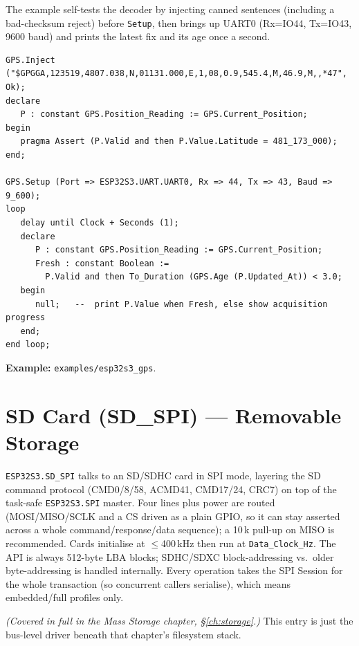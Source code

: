 The example self-tests the decoder by injecting canned sentences (including a
bad-checksum reject) before \texttt{Setup}, then brings up UART0 (Rx=IO44, Tx=IO43,
9600 baud) and prints the latest fix and its age once a second.

\begin{lstlisting}
GPS.Inject ("$GPGGA,123519,4807.038,N,01131.000,E,1,08,0.9,545.4,M,46.9,M,,*47", Ok);
declare
   P : constant GPS.Position_Reading := GPS.Current_Position;
begin
   pragma Assert (P.Valid and then P.Value.Latitude = 481_173_000);
end;

GPS.Setup (Port => ESP32S3.UART.UART0, Rx => 44, Tx => 43, Baud => 9_600);
loop
   delay until Clock + Seconds (1);
   declare
      P : constant GPS.Position_Reading := GPS.Current_Position;
      Fresh : constant Boolean :=
        P.Valid and then To_Duration (GPS.Age (P.Updated_At)) < 3.0;
   begin
      null;   --  print P.Value when Fresh, else show acquisition progress
   end;
end loop;
\end{lstlisting}

\noindent\textbf{Example:} \texttt{examples/esp32s3\_gps}.

\section{SD Card (SD\_SPI) --- Removable Storage}
\label{app:ext:sdspi}

\texttt{ESP32S3.SD\_SPI} talks to an SD/SDHC card in SPI mode, layering the SD
command protocol (CMD0/8/58, ACMD41, CMD17/24, CRC7) on top of the task-safe
\texttt{ESP32S3.SPI} master. Four lines plus power are routed (MOSI/MISO/SCLK and a
CS driven as a plain GPIO, so it can stay asserted across a whole
command/response/data sequence); a 10\,k pull-up on MISO is recommended. Cards
initialise at $\leq$400\,kHz then run at \texttt{Data\_Clock\_Hz}. The API is always
512-byte LBA blocks; SDHC/SDXC block-addressing vs.\ older byte-addressing is
handled internally. Every operation takes the SPI Session for the whole transaction
(so concurrent callers serialise), which means embedded/full profiles only.

\emph{(Covered in full in the Mass Storage chapter, \S\ref{ch:storage}.)} This
entry is just the bus-level driver beneath that chapter's filesystem stack.

